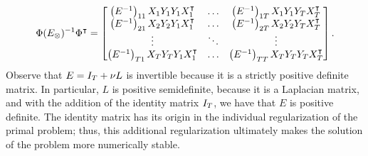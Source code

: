 \begin{equation}
    \label{eq:laplacian_block_linear}
    \begin{aligned}
    \Phi (E_\otimes)^{-1} \Phi^\intercal 
    =\begin{bmatrix}
        \left(E^{-1}\right)_{11} X_1 Y_1 Y_1 X_1^\intercal            & \ldots & \left(E^{-1}\right)_{1\ntasks} X_1 Y_1 Y_\ntasks X_\ntasks^\intercal              \\
        \left(E^{-1}\right)_{21} X_2 Y_2 Y_1  X_1^\intercal           & \ldots & \left(E^{-1}\right)_{2\ntasks} X_2 Y_2 Y_\ntasks X_\ntasks^\intercal              \\
        \vdots                                                 & \ddots & \vdots                                                              \\
        \left(E^{-1}\right)_{\ntasks1} X_\ntasks Y_\ntasks Y_1 X_1^\intercal & \ldots & \left(E^{-1}\right)_{\ntasks \ntasks} X_\ntasks Y_\ntasks Y_\ntasks X_\ntasks^\intercal \\
    \end{bmatrix} .
\end{aligned}
\end{equation}
Observe that $E = I_T + \nu L$ is invertible because it is a strictly positive definite matrix. In particular, $L$ is positive semidefinite, because it is a Laplacian matrix, and with the addition of the identity matrix $I_T$, we have that $E$ is positive definite. The identity matrix has its origin in the individual regularization of the primal problem; thus, this additional regularization ultimately makes the solution of the problem more numerically stable.

